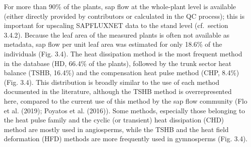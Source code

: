 \documentclass[11pt,twoside]{reedthesis}
\begin{document}
For more than 90\% of the plants, sap flow at the whole-plant level is
available (either directly provided by contributors or calculated in the
QC process); this is important for upscaling SAPFLUXNET data to the
stand level (cf.~section 3.4.2). Because the leaf area of the measured
plants is often not available as metadata, sap flow per unit leaf area
was estimated for only 18.6\% of the individuals (Fig. 3.4). The heat
dissipation method is the most frequent method in the database (HD,
66.4\% of the plants), followed by the trunk sector heat balance (TSHB,
16.4\%) and the compensation heat pulse method (CHP, 8.4\%) (Fig. 3.4).
This distribution is broadly similar to the use of each method
documented in the literature, although the TSHB method is
overrepresented here, compared to the current use of this method by the
sap flow community (Flo et al. (2019); Poyatos et al. (2016)). Some
methods, especially those belonging to the heat pulse family and the
cyclic (or transient) heat dissipation (CHD) method are mostly used in
angiosperms, while the TSHB and the heat field deformation (HFD) methods
are more frequently used in gymnosperms (Fig. 3.4).\par
\end{document}

